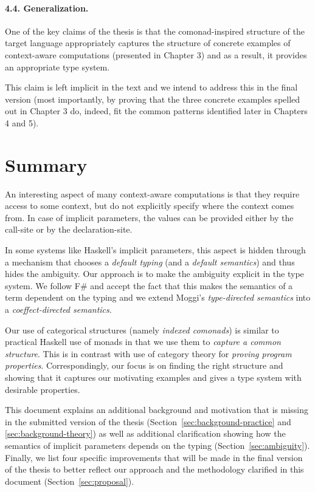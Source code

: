 \documentclass[
		twoside,openright,titlepage,numbers=noenddot,headinclude,%
                footinclude=true,cleardoublepage=empty,
                BCOR=10mm,paper=a4,fontsize=10pt, %
                ngerman,american, %
                ]{scrreprt}
\begin{document}
\paragraph{4.4. Generalization.}

One of the key claims of the thesis is that the comonad-inspired structure of the target
language appropriately captures the structure of concrete examples of context-aware computations
(presented in Chapter 3) and as a result, it provides an appropriate type system.

This claim is left implicit in the text and we intend to address this in the final version (most
importantly, by proving that the three concrete examples spelled out in Chapter 3 do, indeed, fit
the common patterns identified later in Chapters 4 and 5).


\section{Summary}

An interesting aspect of many context-aware computations is that they require access to some
context, but do not explicitly specify where the context comes from. In case of implicit parameters,
the values can be provided either by the call-site or by the declaration-site.

In some systems like Haskell's implicit parameters, this aspect is hidden through a mechanism that
chooses a \emph{default typing} (and a \emph{default semantics}) and thus hides the ambiguity. Our approach is
to make the ambiguity explicit in the type system. We follow F\# and accept the fact that this
makes the semantics of a term dependent on the typing and we extend Moggi's \emph{type-directed
semantics} into a \emph{coeffect-directed semantics}.

Our use of categorical structures (namely \emph{indexed comonads}) is similar to practical Haskell
use of monads in that we use them to \emph{capture a common structure}. This is in contrast with
use of category theory for \emph{proving program properties}. Correspondingly, our focus is on
finding the right structure and showing that it captures our motivating examples and gives a type
system with desirable properties.

This document explains an additional background and motivation that is missing in the submitted
version of the thesis (Section~\ref{sec:background-practice} and \ref{sec:background-theory}) as
well as additional clarification showing how the semantics of implicit parameters depends on the
typing (Section~\ref{sec:ambiguity}). Finally, we list four specific improvements that will be
made in the final version of the thesis to better reflect our approach and the methodology
clarified in this document (Section~\ref{sec:proposal}).



\end{document}
